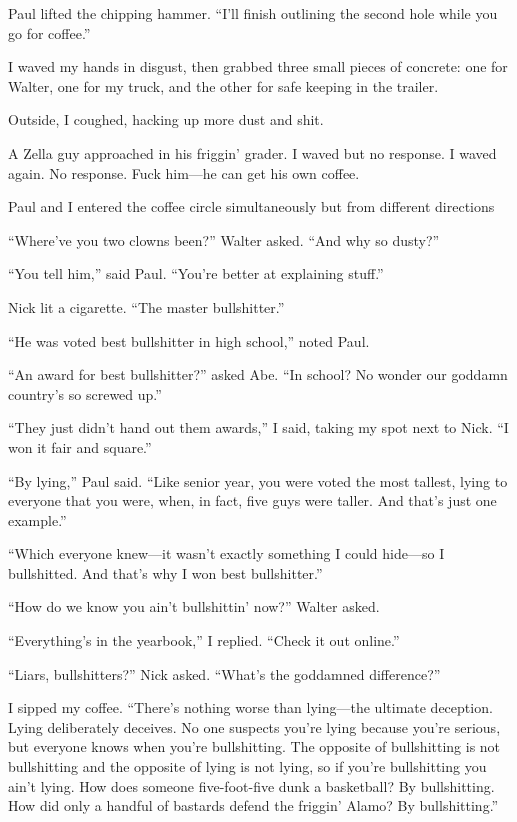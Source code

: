 Paul lifted the chipping hammer. ``I'll finish outlining the second hole
while you go for coffee.''

I waved my hands in disgust, then grabbed three small pieces of
concrete: one for Walter, one for my truck, and the other for safe
keeping in the trailer.

Outside, I coughed, hacking up more dust and shit.

A Zella guy approached in his friggin' grader. I waved but no response.
I waved again. No response. Fuck him---he can get his own coffee.

Paul and I entered the coffee circle simultaneously but from different
directions

``Where've you two clowns been?'' Walter asked. ``And why so dusty?''

``You tell him,'' said Paul. ``You're better at explaining stuff.''

Nick lit a cigarette. ``The master bullshitter.''

``He was voted best bullshitter in high school,'' noted Paul.

``An award for best bullshitter?'' asked Abe. ``In school? No wonder our
goddamn country's so screwed up.''

``They just didn't hand out them awards,'' I said, taking my spot next
to Nick. ``I won it fair and square.''

``By lying,'' Paul said. ``Like senior year, you were voted the most
tallest, lying to everyone that you were, when, in fact, five guys were
taller. And that's just one example.''

``Which everyone knew---it wasn't exactly something I could hide---so I
bullshitted. And that's why I won best bullshitter.''

``How do we know you ain't bullshittin' now?'' Walter asked.

``Everything's in the yearbook,'' I replied. ``Check it out online.''

``Liars, bullshitters?'' Nick asked. ``What's the goddamned
difference?''

I sipped my coffee. ``There's nothing worse than lying---the ultimate
deception. Lying deliberately deceives. No one suspects you're lying
because you're serious, but everyone knows when you're bullshitting. The
opposite of bullshitting is not bullshitting and the opposite of lying
is not lying, so if you're bullshitting you ain't lying. How does
someone five-foot-five dunk a basketball? By bullshitting. How did only
a handful of bastards defend the friggin' Alamo? By bullshitting.''

